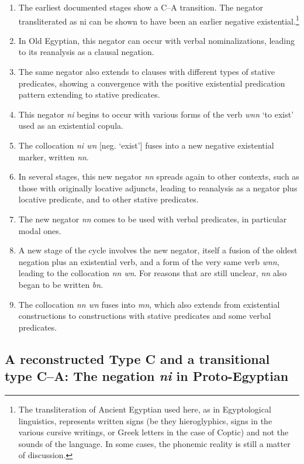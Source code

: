 \documentclass[output=paper]{langsci/langscibook}
\begin{document}
\begin{enumerate}
	\item The earliest documented stages show a C--A transition. The negator transliterated as ni can be shown to have been an earlier negative existential.\footnote{The transliteration of Ancient Egyptian used here, as in Egyptological linguistics, represents written signs (be they hieroglyphics, signs in the various cursive writings, or Greek letters in the case of Coptic) and not the sounds of the language. In some cases, the phonemic reality is still a matter of discussion. }
	\item In Old Egyptian, this negator can occur with verbal nominalizations, leading to its reanalysis as a clausal negation.
	\item The same negator also extends to clauses with different types of stative predicates, showing a convergence with the positive existential predication pattern extending to stative predicates.
	\item This negator \textit{ni} begins to occur with various forms of the verb \textit{wnn} ‘to exist’ used as an existential copula.
	\item The collocation \textit{ni wn} [neg. ‘exist’] fuses into a new negative existential marker, written \textit{nn}.
	\item In several stages, this new negator \textit{nn} spreads again to other contexts, such as those with originally locative adjuncts, leading to reanalysis as a negator plus locative predicate, and to other stative predicates.
	\item The new negator \textit{nn} comes to be used with verbal predicates, in particular modal ones.
	\item A new stage of the cycle involves the new negator, itself a fusion of the oldest negation plus an existential verb, and a form of the very same verb \textit{wnn}, leading to the collocation \textit{nn wn}. For reasons that are still unclear, \textit{nn} also began to be written \textit{bn}.
	\item The collocation \textit{nn wn} fuses into \textit{mn}, which also extends from existential constructions to constructions with stative predicates and some verbal predicates.
\end{enumerate}


\subsection{A reconstructed Type C and a transitional type C--A: The negation \textit{ni} in Proto-Egyptian}\label{s:AE2-1}
\end{document}
